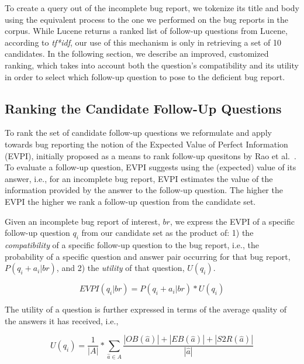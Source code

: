 To create a query out of the incomplete bug report, we tokenize its title and body
using the equivalent process to the one we performed on the bug reports in the corpus.
While Lucene returns a ranked list of follow-up questions from Lucene, according to {\em tf*idf}, our
use of this mechanism is only in retrieving a set of 10 candidates. In the following section, we describe
an improved, customized ranking, which takes into account both the question's compatibility and its utility
in order to select which follow-up question to pose to the deficient bug report.


\subsection{Ranking the Candidate Follow-Up Questions}\label{sec:ranking}

To rank the set of candidate follow-up questions we reformulate and apply towards bug reporting
the notion of the Expected Value of Perfect Information (EVPI), initially proposed as a means to
rank follow-up quesitons by Rao et al.~\cite{rao-daume-iii-2018-learning}. To evaluate a follow-up question, EVPI suggests
using the (expected) value of its answer, i.e., for an
incomplete bug report, EVPI estimates the value of the information provided by the answer to the
follow-up question. The higher the EVPI the higher we rank a follow-up question from the candidate
set.

Given an incomplete bug report of interest, $br$, we express the EVPI of a specific follow-up question $q_{i}$ from our candidate set
as the product of: 1) the {\em compatibility} of a specific follow-up question to the bug report, i.e.,
the probability of a specific question and answer pair occurring for that bug report, $P(q_{i}+a_{i}|br)$, and 2) the {\em utility} of that question, $U(q_{i})$.

$$EVPI(q_{i}|br) = P(q_{i}+a_{i}|br) * U(q_{i})$$

The utility of a question is further expressed in terms of the average quality of the answers it has received, i.e.,

$$U(q_{i}) = \frac{1}{|A|} * \sum_{\hat a \in A}^{} \frac{|OB(\hat a)|+|EB(\hat a)|+|S2R(\hat a)|}{|\hat a|}$$

